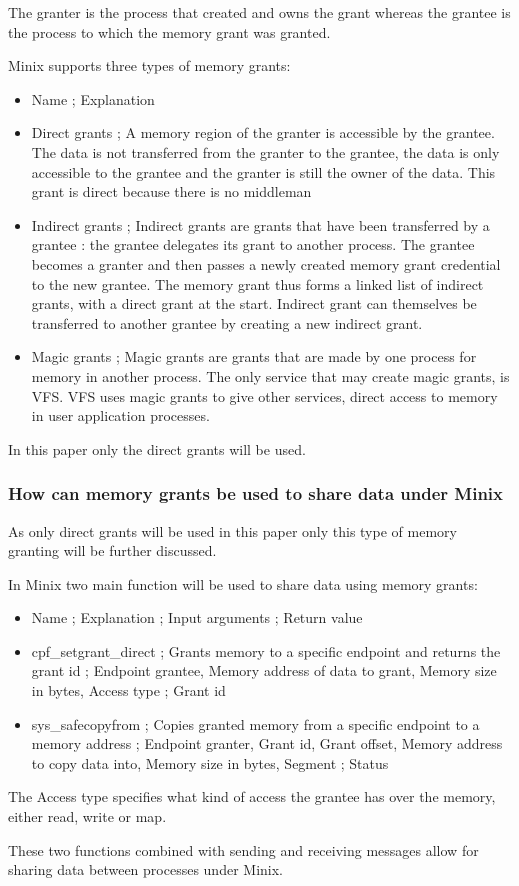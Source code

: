 The granter is the process that created and owns the grant whereas the
grantee is the process to which the memory grant was granted.

Minix supports three types of memory grants:

\begin{itemize}
\tightlist
\item
  Name ; Explanation
\item
  Direct grants ; A memory region of the granter is accessible by the
  grantee. The data is not transferred from the granter to the grantee,
  the data is only accessible to the grantee and the granter is still
  the owner of the data. This grant is direct because there is no
  middleman
\item
  Indirect grants ; Indirect grants are grants that have been
  transferred by a grantee : the grantee delegates its grant to another
  process. The grantee becomes a granter and then passes a newly created
  memory grant credential to the new grantee. The memory grant thus
  forms a linked list of indirect grants, with a direct grant at the
  start. Indirect grant can themselves be transferred to another grantee
  by creating a new indirect grant.
\item
  Magic grants ; Magic grants are grants that are made by one process
  for memory in another process. The only service that may create magic
  grants, is VFS. VFS uses magic grants to give other services, direct
  access to memory in user application processes.
\end{itemize}

In this paper only the direct grants will be used.

\hypertarget{how-can-memory-grants-be-used-to-share-data-under-minix}{%
\subsubsection{How can memory grants be used to share data under
Minix}\label{how-can-memory-grants-be-used-to-share-data-under-minix}}

As only direct grants will be used in this paper only this type of
memory granting will be further discussed.

In Minix two main function will be used to share data using memory
grants:

\begin{itemize}
\tightlist
\item
  Name ; Explanation ; Input arguments ; Return value
\item
  cpf\_setgrant\_direct ; Grants memory to a specific endpoint and
  returns the grant id ; Endpoint grantee, Memory address of data to
  grant, Memory size in bytes, Access type ; Grant id
\item
  sys\_safecopyfrom ; Copies granted memory from a specific endpoint to
  a memory address ; Endpoint granter, Grant id, Grant offset, Memory
  address to copy data into, Memory size in bytes, Segment ; Status
\end{itemize}

The Access type specifies what kind of access the grantee has over the
memory, either read, write or map.

These two functions combined with sending and receiving messages allow
for sharing data between processes under Minix.
